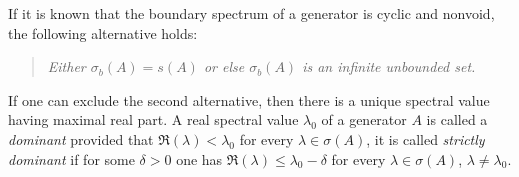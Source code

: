 If it is known that the boundary spectrum of a generator is cyclic and nonvoid, the following alternative holds:
\begin{quote}
\emph{Either $ \sigma_{b}(A) = s(A) $ or else $ \sigma_{b}(A) $ is an infinite unbounded set.}
\end{quote}
If one can exclude the second alternative, then there is a unique spectral value having maximal real part.
A real spectral value $\lambda_{0}$ of a generator $A$ is called a \emph{dominant} provided that $\Re(\lambda) < \lambda_{0}$ for every $\lambda \in \sigma(A)$, it is called \emph{strictly dominant} if for some $\delta > 0$ one has $\Re(\lambda) \leq \lambda_{0} - \delta$ for every $\lambda \in \sigma(A)$, $\lambda \neq \lambda_{0}$.

